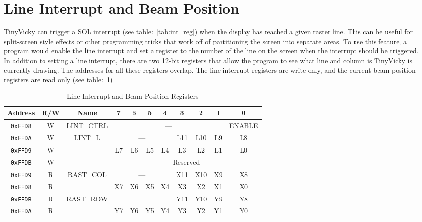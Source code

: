 \section*{Line Interrupt and Beam Position}

TinyVicky can trigger a SOL interrupt (see table:~\ref{tab:int_reg}) when the display has reached a given raster line. This can be useful for split-screen style effects or other programming tricks that work off of partitioning the screen into separate areas. To use this feature, a program would enable the line interrupt and set a register to the number of the line on the screen when the interrupt should be triggered. In addition to setting a line interrupt, there are two 12-bit registers that allow the program to see what line and column is TinyVicky is currently drawing. The addresses for all these registers overlap. The line interrupt registers are write-only, and the current beam position registers are read only (see table:~\ref{tab:lint_reg})

\begin{table}[ht]
    \begin{center}
        \begin{tabular}{|c|c|c|c|c|c|c|c|c|c|c|} \hline
            Address & R/W & Name & 7 & 6 & 5 & 4 & 3 & 2 & 1 & 0 \\\hline\hline
            \verb+0xFFD8+ & W & LINT\_CTRL & \multicolumn{7}{|c|}{---} & ENABLE \\ \hline
            \verb+0xFFDA+ & W & \multirow{2}{*}{LINT\_L} & \multicolumn{4}{|c|}{---} & L11 & L10 & L9 & L8 \\ \cline{1-2}\cline{4-11}
            \verb+0xFFD9+ & W &  & L7 & L6 & L5 & L4 & L3 & L2 & L1 & L0 \\ \hline
            \verb+0xFFDB+ & W & --- & \multicolumn{8}{|c|}{Reserved} \\ \hline

            \verb+0xFFD9+ & R & \multirow{2}{*}{RAST\_COL} & \multicolumn{4}{|c|}{---} & X11 & X10 & X9 & X8 \\ \cline{1-2}\cline{4-11}
            \verb+0xFFD8+ & R & & X7 & X6 & X5 & X4 & X3 & X2 & X1 & X0 \\  \hline
            \verb+0xFFDB+ & R & \multirow{2}{*}{RAST\_ROW} & \multicolumn{4}{|c|}{---} & Y11 & Y10 & Y9 & Y8 \\ \cline{1-2}\cline{4-11}
            \verb+0xFFDA+ & R & & Y7 & Y6 & Y5 & Y4 & Y3 & Y2 & Y1 & Y0 \\  \hline
        \end{tabular}
    \end{center}
    \caption{Line Interrupt and Beam Position Registers}
    \label{tab:lint_reg}
\end{table}


